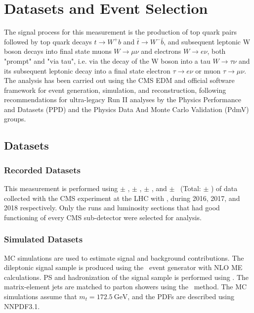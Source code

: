 
\chapter{Datasets and Event Selection}
The signal process for this measurement is the production of top quark pairs followed by top quark decays $t\to W^+ b$ and $\bar{t}\to W^- \bar{b}$, and subsequent leptonic W boson decays into final state muons $W\to \mu\nu$ and electrons $W\to e\nu$, both "prompt" and "via tau", i.e. via the decay of the W boson into a tau $W\to \tau\nu$ and its subsequent leptonic decay into a final state electron $\tau\to e\nu$ or muon $\tau\to \mu\nu$.
The analysis has been carried out using the CMS EDM and official software framework for event generation, simulation, and reconstruction, following recommendations for ultra-legacy Run II analyses by the Physics Performance and Datasets (PPD) and the Physics Data And Monte Carlo Validation (PdmV) groups.

\section{Datasets}

\subsection{Recorded Datasets}
This measurement is performed using \lumivalueSixPreVFP $\pm$ \lumierrSixPreVFP, \lumivalueSixPostVFP $\pm$ \lumierrSixPostVFP, \lumivalueSeven $\pm$ \lumierrSeven, and \lumivalueEight $\pm$ \lumierrEight\ (Total: \lumivalueRuniiUL $\pm$ \lumierrRuniiUL) of data collected with the CMS experiment at the LHC with \beamenergy, during 2016, 2017, and 2018 respectively.
Only the runs and luminosity sections that had good functioning of every CMS sub-detector were selected for analysis.

\subsection{Simulated Datasets}
MC simulations are used to estimate signal and background contributions. 
The dileptonic \ttbar signal sample is produced using the \Powheg\ event generator with NLO ME calculations. 
PS and hadronization of the \ttbar signal sample is performed using \Pythia. 
The matrix-element jets are matched to parton showers using the \Powheg\ method. 
The MC simulations assume that $m_t = \SI{172.5}{\GeV}$, and the PDFs are described using NNPDF3.1.

